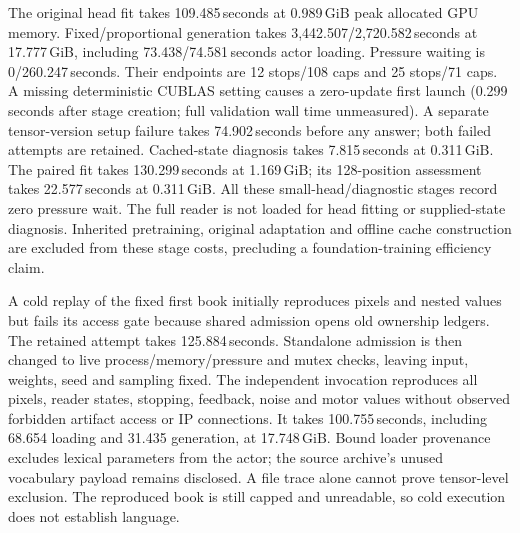 The original head fit takes 109.485\,seconds at 0.989\,GiB peak allocated GPU
memory. Fixed/proportional generation takes 3,442.507/2,720.582\,seconds at
17.777\,GiB, including 73.438/74.581\,seconds actor loading. Pressure waiting
is 0/260.247\,seconds. Their endpoints are 12 stops/108 caps and 25 stops/71
caps. A missing deterministic CUBLAS setting causes a zero-update first
launch (0.299\,seconds after stage creation; full validation wall time
unmeasured). A separate tensor-version setup failure takes 74.902\,seconds
before any answer; both failed attempts are retained. Cached-state diagnosis
takes 7.815\,seconds at 0.311\,GiB. The paired fit takes 130.299\,seconds at
1.169\,GiB; its 128-position assessment takes 22.577\,seconds at 0.311\,GiB.
All these small-head/diagnostic stages record zero pressure wait. The full
reader is not loaded for head fitting or supplied-state diagnosis. Inherited
pretraining, original adaptation and offline cache construction are excluded
from these stage costs, precluding a foundation-training efficiency claim.

A cold replay of the fixed first book initially reproduces pixels and nested
values but fails its access gate because shared admission opens old ownership
ledgers. The retained attempt takes 125.884\,seconds. Standalone admission is
then changed to live process/memory/pressure and mutex checks, leaving input,
weights, seed and sampling fixed. The independent invocation reproduces all
pixels, reader states, stopping, feedback, noise and motor values without
observed forbidden artifact access or IP connections. It takes
100.755\,seconds, including 68.654 loading and 31.435 generation, at
17.748\,GiB. Bound loader provenance excludes lexical parameters from the
actor; the source archive's unused vocabulary payload remains disclosed.
A file trace alone cannot prove tensor-level exclusion. The reproduced book
is still capped and unreadable, so cold execution does not establish language.

